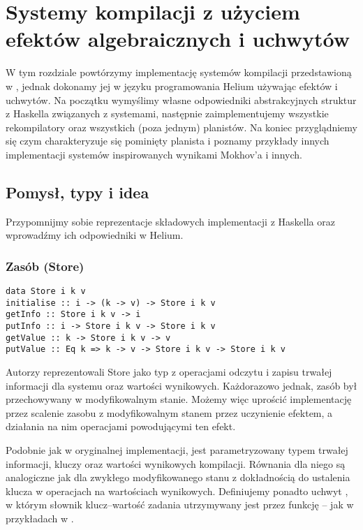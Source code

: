 
\chapter{Systemy kompilacji z użyciem efektów algebraicznych i uchwytów}
\label{chapter-bsue}

W tym rozdziale powtórzymy implementację systemów kompilacji przedstawioną w \BSaLC\cite{mokhov2018build}, jednak dokonamy jej w języku programowania Helium używając efektów i uchwytów. Na początku wymyślimy własne odpowiedniki abstrakcyjnych struktur z Haskella związanych z systemami, następnie zaimplementujemy wszystkie rekompilatory oraz wszystkich (poza jednym) planistów. Na koniec przyglądniemy się czym charakteryzuje się pominięty planista i poznamy przykłady innych implementacji systemów inspirowanych wynikami Mokhov'a i innych.

\section{Pomysł, typy i idea}

Przypomnijmy sobie reprezentacje składowych implementacji z Haskella oraz wprowadźmy ich odpowiedniki w Helium.

\subsection{Zasób (Store)}

\begin{lstlisting}[style=haskell-style]
data Store i k v
initialise :: i -> (k -> v) -> Store i k v
getInfo :: Store i k v -> i
putInfo :: i -> Store i k v -> Store i k v
getValue :: k -> Store i k v -> v
putValue :: Eq k => k -> v -> Store i k v -> Store i k v
\end{lstlisting}

Autorzy \BSaLC\cite{mokhov2018build} reprezentowali Store jako typ z operacjami odczytu i zapisu trwałej informacji dla systemu oraz wartości wynikowych. Każdorazowo jednak, zasób był przechowywany w modyfikowalnym stanie. Możemy więc uprościć implementację przez scalenie zasobu z modyfikowalnym stanem przez uczynienie  efektem, a działania na nim operacjami powodującymi ten efekt.



Podobnie jak  w oryginalnej implementacji,  jest parametryzowany typem trwałej informacji, kluczy oraz wartości wynikowych kompilacji. Równania dla niego są analogiczne jak dla zwykłego modyfikowanego stanu z dokładnością do ustalenia klucza w operacjach na wartościach wynikowych. Definiujemy ponadto uchwyt , w którym słownik klucz--wartość zadania utrzymywany jest przez funkcję -- jak w przykładach w \BSaLC{}.

